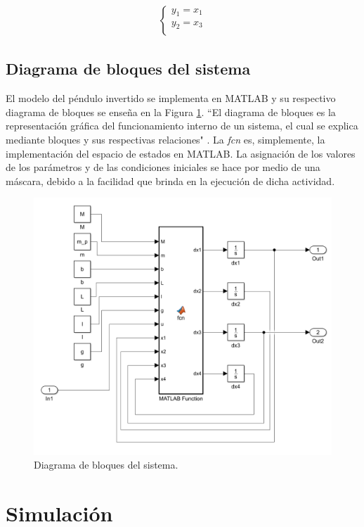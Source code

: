 \documentclass[journal]{IEEEtran}
\begin{document}
\begin{eqnarray}
  \label{eq: salidas}
  \left\{
  \begin{array}{ll}
    y_1=x_1\\
    y_2=x_3\\
  \end{array}
  \right.
\end{eqnarray}

\subsection{Diagrama de bloques del sistema}
El modelo del péndulo invertido se implementa en MATLAB y su respectivo diagrama de bloques se enseña en la Figura \ref{sistema}. ``El diagrama de bloques es la representación gráfica del funcionamiento interno de un sistema, el cual se explica mediante bloques y sus respectivas relaciones" \cite{wiki:diagra}. La \textit{fcn} es, simplemente, la implementación del espacio de estados en MATLAB. La asignación de los valores de los parámetros y de las condiciones iniciales se hace por medio de una máscara, debido a la facilidad que brinda en la ejecución de dicha actividad.

\begin{figure}[ht!]
\caption{Diagrama de bloques del sistema.\label{sistema}}
  \centering
\includegraphics[scale=0.6]{diagrama_bloques_subsistema.PNG}
\end{figure}

\section{Simulación}
\end{document}

